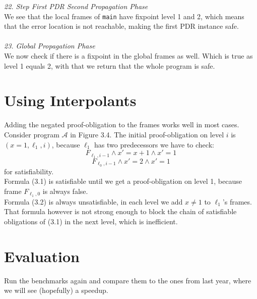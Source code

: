 \documentclass{article}
\begin{document}
\vspace*{1em}

\textsl{22. Step First PDR Second Propagation Phase} \\
We see that the local frames of \texttt{main} have fixpoint level 1 and 2, which means that the error location is not reachable, making the first PDR instance safe.  \\ \\

\textsl{23. Global Propagation Phase} \\
We now check if there is a fixpoint in the global frames as well. Which is true as level 1 equals 2, with that we return that the whole program is safe.

	
	
	
	\pagebreak
	\section{Using Interpolants}
	Adding the negated proof-obligation to the frames works well in most cases. Consider program $\mathcal{A}$ in Figure 3.4. The initial proof-obligation on level $i$ is $(x = 1, \ell_1, i)$, because $\ell_1$ has two predecessors we have to check:
	\begin{equation}
	F_{\ell_1, i - 1} \land x' = x + 1 \land x' = 1
	\end{equation}
	\begin{equation}
	F_{\ell_0, i - 1} \land x' = 2 \land x' = 1
	\end{equation}
	for satisfiability. \\
	Formula (3.1) is satisfiable until we get a proof-obligation on level 1, because frame $F_{\ell_1, 0}$ is always false. \\
	Formula (3.2) is always unsatisfiable, in each level we add $x \neq 1$ to $\ell_1$'s frames. That formula however is not strong enough to block the chain of satisfiable obligations of (3.1) in the next level, which is inefficient.
	
	
	
	\section{Evaluation}
	Run the benchmarks again and compare them to the ones from last year, where we will see (hopefully) a speedup.
	
	\pagebreak
	



	
\end{document}
